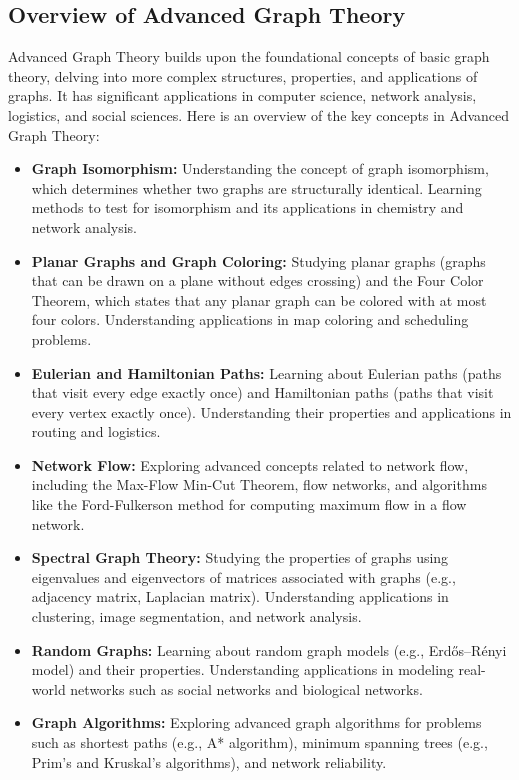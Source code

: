 \documentclass[openany]{book}
\begin{document}
\subsection{Overview of Advanced Graph Theory}
Advanced Graph Theory builds upon the foundational concepts of basic graph theory, delving into more complex structures, properties, and applications of graphs. It has significant applications in computer science, network analysis, logistics, and social sciences. Here is an overview of the key concepts in Advanced Graph Theory:
\begin{itemize}
    \item \textbf{Graph Isomorphism:} Understanding the concept of graph isomorphism, which determines whether two graphs are structurally identical. Learning methods to test for isomorphism and its applications in chemistry and network analysis.
    \item \textbf{Planar Graphs and Graph Coloring:} Studying planar graphs (graphs that can be drawn on a plane without edges crossing) and the Four Color Theorem, which states that any planar graph can be colored with at most four colors. Understanding applications in map coloring and scheduling problems.
    \item \textbf{Eulerian and Hamiltonian Paths:} Learning about Eulerian paths (paths that visit every edge exactly once) and Hamiltonian paths (paths that visit every vertex exactly once). Understanding their properties and applications in routing and logistics.
    \item \textbf{Network Flow:} Exploring advanced concepts related to network flow, including the Max-Flow Min-Cut Theorem, flow networks, and algorithms like the Ford-Fulkerson method for computing maximum flow in a flow network.
    \item \textbf{Spectral Graph Theory:} Studying the properties of graphs using eigenvalues and eigenvectors of matrices associated with graphs (e.g., adjacency matrix, Laplacian matrix). Understanding applications in clustering, image segmentation, and network analysis.
    \item \textbf{Random Graphs:} Learning about random graph models (e.g., Erdős–Rényi model) and their properties. Understanding applications in modeling real-world networks such as social networks and biological networks.
    \item \textbf{Graph Algorithms:} Exploring advanced graph algorithms for problems such as shortest paths (e.g., A* algorithm), minimum spanning trees (e.g., Prim's and Kruskal's algorithms), and network reliability.

\end{itemize}
\end{document}
